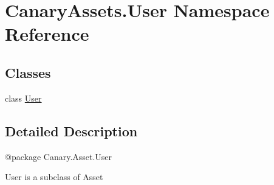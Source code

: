 \hypertarget{namespace_canary_assets_1_1_user}{\section{Canary\-Assets.\-User Namespace Reference}
\label{namespace_canary_assets_1_1_user}
}
\subsection*{Classes}
\begin{DoxyCompactItemize}
\item 
class \hyperlink{class_canary_assets_1_1_user_1_1_user}{User}
\end{DoxyCompactItemize}


\subsection{Detailed Description}
\begin{DoxyVerb}@package Canary.Asset.User

User is a subclass of Asset
\end{DoxyVerb}
 